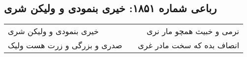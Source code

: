 \begin{center}
\section*{رباعی شماره ۱۸۵۱: خیری بنمودی و ولیکن شری}
\label{sec:1851}
\begin{longtable}{l p{0.5cm} r}
خیری بنمودی و ولیکن شری
&&
نرمی و خبیث همچو مار نری
\\
صدری و بزرگی و زرت هست ولیک
&&
انصاف بده که سخت مادر غری
\\
\end{longtable}
\end{center}
